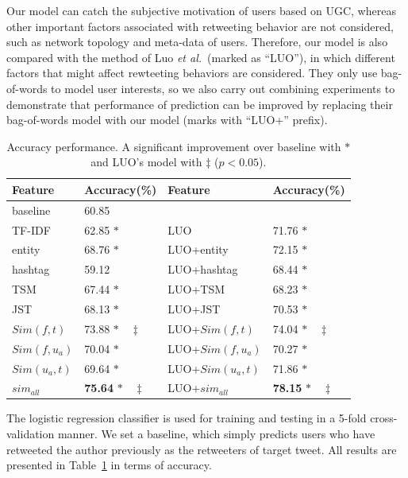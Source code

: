 \documentclass[letterpaper]{article}
\begin{document}
Our model can catch the subjective motivation of users based on UGC, whereas other important factors associated with retweeting behavior are not considered, such as network topology and meta-data of users. 
Therefore, our model is also compared with the method of Luo \emph{et al.}~(marked as ``LUO''), in which different factors that might affect rewteeting behaviors are considered.
They only use bag-of-words to model user interests, so we also carry out combining experiments to demonstrate that performance of prediction can be improved by replacing their bag-of-words model with our model (marks with ``LUO+'' prefix). 
\begin{table}[htb]
\scriptsize
\centering
\caption{Accuracy performance. A significant improvement over baseline with $ \ast $ and LUO's model with $ \ddagger $ ($p < 0.05$).}
\label{tab3}
\begin{tabular}{|l|l|l|l|}
\hline
Feature & Accuracy(\%) & Feature & Accuracy(\%)\\
\hline
baseline & 60.85 & & \\
\hline
TF-IDF & 62.85   $\ast$ & LUO & 71.76 $ \ast  $\\
entity & 68.76  $\ast$ & LUO+entity & 72.15 $\ast$\\
hashtag & 59.12  & LUO+hashtag & 68.44 $\ast$\\
\hline
TSM & 67.44 $\ast$ & LUO+TSM & 68.23 $\ast$\\
JST & 68.13 $\ast$ & LUO+JST & 70.53 $\ast$\\
\hline
$ Sim(f,t) $ & 73.88   $\ast  \quad \ddagger $ &LUO+$ Sim(f,t)$ & 74.04  $ \ast \quad \ddagger $\\
$ Sim(f,u_a)  $ & 70.04   $\ast  $ & LUO+$ Sim(f,u_a)$ & 70.27  $ \ast $\\
$ Sim(u_a,t)  $ & 69.64   $\ast  $ & LUO+$ Sim(u_a,t)$ & 71.86  $ \ast $\\
$ sim_{all}  $ & \textbf{75.64}   $\ast \quad \ddagger $ & LUO+$ sim_{all}  $ & \textbf{78.15}  $ \ast \quad \ddagger $\\
\hline
\end{tabular}
\end{table}

The logistic regression classifier is used for training and testing in a 5-fold cross-validation manner.
We set a baseline, which simply predicts users who have retweeted the author previously as the retweeters of target tweet. 
All results are presented in Table~\ref{tab3} in terms of accuracy.
\end{document}
